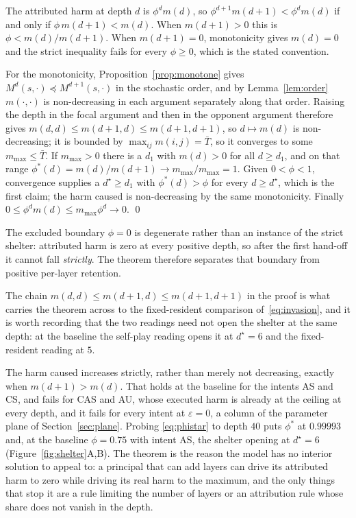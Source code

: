 \documentclass[a4paper,fleqn]{cas-sc}
\newcommand{\AS}{\textsf{AS}}
\newcommand{\CS}{\textsf{CS}}
\newcommand{\CAS}{\textsf{CAS}}
\newcommand{\AU}{\textsf{AU}}
\begin{document}
\begin{pf}
The attributed harm at depth $d$ is $\phi^{d}m(d)$, so
$\phi^{d+1}m(d+1)<\phi^{d}m(d)$ if and only if $\phi\,m(d+1)<m(d)$. When
$m(d+1)>0$ this is $\phi<m(d)/m(d+1)$. When $m(d+1)=0$, monotonicity gives
$m(d)=0$ and the strict inequality fails for every $\phi\ge0$, which is the
stated convention.

For the monotonicity, Proposition~\ref{prop:monotone} gives
$M^{d}(s,\cdot)\preceq M^{d+1}(s,\cdot)$ in the stochastic order, and by
Lemma~\ref{lem:order} $m(\cdot,\cdot)$ is non-decreasing in each argument
separately along that order. Raising the depth in the focal argument and then
in the opponent argument therefore gives
$m(d,d)\le m(d{+}1,d)\le m(d{+}1,d{+}1)$, so $d\mapsto m(d)$ is non-decreasing;
it is bounded by $\max_{ij}m(i,j)=\bar T$, so it converges to some
$m_{\max}\le\bar T$. If $m_{\max}>0$ there is a $d_{1}$ with $m(d)>0$ for all
$d\ge d_{1}$, and on that range $\phi^{*}(d)=m(d)/m(d+1)\to
  m_{\max}/m_{\max}=1$. Given $0<\phi<1$, convergence supplies a
$d^{\star}\ge d_{1}$ with $\phi^{*}(d)>\phi$ for every $d\ge d^{\star}$, which
is the first claim; the harm caused is non-decreasing by the same monotonicity.
Finally $0\le\phi^{d}m(d)\le m_{\max}\phi^{d}\to0$.
\qed
\end{pf}

The excluded boundary $\phi=0$ is degenerate rather than an instance of the
strict shelter: attributed harm is zero at every positive depth, so after the
first hand-off it cannot fall \emph{strictly}. The theorem therefore separates
that boundary from positive per-layer retention.

The chain $m(d,d)\le m(d{+}1,d)\le m(d{+}1,d{+}1)$ in the proof is what carries
the theorem across to the fixed-resident comparison of~\eqref{eq:invasion}, and
it is worth recording that the two readings need not open the shelter at the
same depth: at the baseline the self-play reading opens it at
$d^{\star}=6$ and the fixed-resident reading at $5$.

The harm caused increases strictly, rather than merely not decreasing, exactly
when $m(d{+}1)>m(d)$. That holds at the baseline for the intents \AS{} and
\CS{}, and fails for \CAS{} and \AU{}, whose executed harm is already at the
ceiling at every depth, and it fails for every intent at $\varepsilon=0$, a
column of the parameter plane of Section~\ref{sec:plane}. Probing
\eqref{eq:phistar} to depth $40$ puts $\phi^{*}$ at $0.99993$ and, at the
baseline $\phi=0.75$ with intent \AS{}, the shelter opening at $d^{\star}=6$
(Figure~\ref{fig:shelter}A,B). The theorem is the reason the model has no
interior solution to appeal to: a principal that can add layers can drive its
attributed harm to zero while driving its real harm to the maximum, and the
only things that stop it are a rule limiting the number of layers or an
attribution rule whose share does not vanish in the depth.
\end{document}
